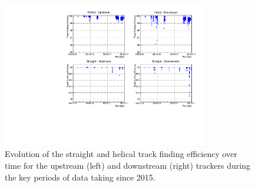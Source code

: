 \begin{figure}
  \centering
  \includegraphics[width=0.80\textwidth]{historical_analysis_plot.pdf}
  \caption{\label{fig:trackers:performance:historical} Evolution of the straight and helical track finding efficiency over time for the upstream (left) and downstream (right) trackers during the key periods of data taking since 2015.}
\end{figure}
